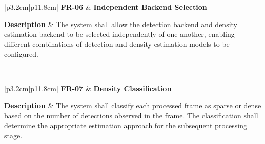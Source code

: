 \begin{table}[H]
	\centering
	\renewcommand{\arraystretch}{1.25}
	\begin{tabular}{|p{3.2cm}|p{11.8cm}|}
		\hline
		\textbf{FR-06} &
		\textbf{Independent Backend Selection} \\ \hline
		
		\textbf{Description} &
		The system shall allow the detection backend and density estimation backend to be selected independently of one another, enabling different combinations of detection and density estimation models to be configured. \\ \hline
		
		 \\ \hline
	\end{tabular}
	\caption{Functional requirement for independent backend selection.}
	\label{tab:fr06}
\end{table}


\begin{table}[H]
	\centering
	\renewcommand{\arraystretch}{1.25}
	\begin{tabular}{|p{3.2cm}|p{11.8cm}|}
		\hline
		\textbf{FR-07} &
		\textbf{Density Classification} \\ \hline
		
		\textbf{Description} &
		The system shall classify each processed frame as sparse or dense based on the number of detections observed in the frame. The classification shall determine the appropriate estimation approach for the subsequent processing stage. \\ \hline
		
		 \\ \hline
	\end{tabular}
	\caption{Functional requirement for density classification.}
	\label{tab:fr07}
\end{table}

